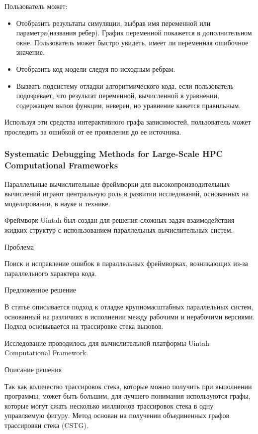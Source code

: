 Пользователь может:
\begin{itemize}
	\item Отобразить результаты симуляции, выбрав имя переменной или параметра(названия ребер). График переменной покажется в дополнительном окне. Пользователь может быстро увидеть, имеет ли переменная ошибочное значение.
	\item Отобразить код модели следуя по исходным ребрам.
	\item Вызвать подсистему отладки алгоритмического кода, если пользователь подозревает, что результат переменной, вычисленной в уравнении, содержащем вызов функции, неверен, но уравнение кажется правильным.
\end{itemize}

Используя эти средства интерактивного графа зависимостей, пользователь может проследить за ошибкой от ее проявления до ее источника.

\subsubsection{Systematic Debugging Methods for Large-Scale HPC Computational Frameworks}

Параллельные вычислительные фреймворки для высокопроизводительных вычислений играют центральную роль в развитии исследований, основанных на моделировании, в науке и технике.

Фреймворк Uintah был создан для решения сложных задач взаимодействия жидких структур с использованием параллельных вычислительных систем.
\newline

Проблема

Поиск и исправление ошибок в параллельных фреймворках, возникающих из-за параллельного характера кода.
\newline

Предложенное решение

В статье описывается подход к отладке крупномасштабных параллельных систем, основанный на различиях в исполнении между рабочими и нерабочими версиями. Подход основывается на трассировке стека вызовов.

Исследование проводилось для вычислительной платформы Uintah Computational Framework.
\newline

Описание решения

Так как количество трассировок стека, которые можно получить при выполнении программы, может быть большим, для лучшего понимания используются графы, которые могут сжать несколько миллионов трассировок стека в одну управляемую фигуру. Метод основан на получении объединенных графов трассировки стека (CSTG). 

